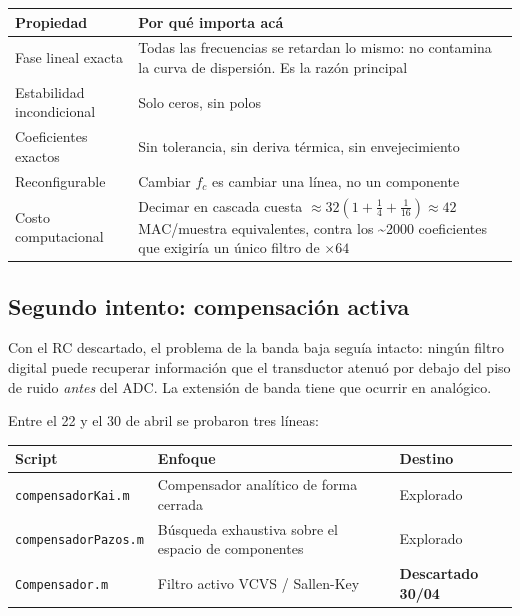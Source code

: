 \begin{center}\small
\begin{tabularx}{\textwidth}{@{}l X@{}}
\toprule
\textbf{Propiedad} & \textbf{Por qu\'e importa ac\'a} \\
\midrule
Fase lineal exacta & Todas las frecuencias se retardan lo mismo: no contamina la curva de dispersi\'on. Es la raz\'on principal \\
Estabilidad incondicional & Solo ceros, sin polos \\
Coeficientes exactos & Sin tolerancia, sin deriva t\'ermica, sin envejecimiento \\
Reconfigurable & Cambiar $f_c$ es cambiar una l\'inea, no un componente \\
Costo computacional & Decimar en cascada cuesta $\approx 32(1+\tfrac14+\tfrac1{16})\approx 42$ MAC/muestra equivalentes, contra los \textasciitilde{}2000 coeficientes que exigir\'ia un \'unico filtro de $\times64$ \\
\bottomrule
\end{tabularx}
\end{center}


\subsection{Segundo intento: compensaci\'on activa}

Con el RC descartado, el problema de la banda baja segu\'ia intacto: ning\'un
filtro digital puede recuperar informaci\'on que el transductor atenu\'o por
debajo del piso de ruido \emph{antes} del ADC. La extensi\'on de banda tiene que
ocurrir en anal\'ogico.

Entre el 22 y el 30 de abril se probaron tres l\'ineas:

\begin{center}\small
\begin{tabularx}{\textwidth}{@{}l X l@{}}
\toprule
\textbf{Script} & \textbf{Enfoque} & \textbf{Destino} \\
\midrule
\texttt{compensadorKai.m} & Compensador anal\'itico de forma cerrada & Explorado \\
\texttt{compensadorPazos.m} & B\'usqueda exhaustiva sobre el espacio de componentes & Explorado \\
\texttt{Compensador.m} & Filtro activo VCVS / Sallen-Key & \textbf{Descartado 30/04} \\
\bottomrule
\end{tabularx}
\end{center}

